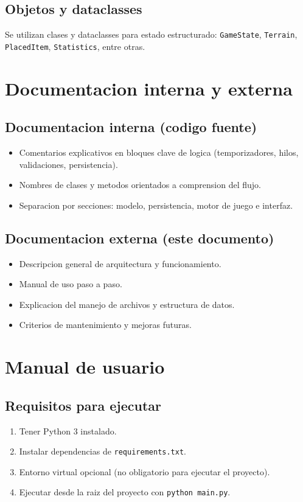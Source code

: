 \documentclass[12pt,a4paper]{article}
\begin{document}
\subsection{Objetos y dataclasses}
Se utilizan clases y dataclasses para estado estructurado: \texttt{GameState}, \texttt{Terrain}, \texttt{PlacedItem}, \texttt{Statistics}, entre otras.

\section{Documentacion interna y externa}
\subsection{Documentacion interna (codigo fuente)}
\begin{itemize}
    \item Comentarios explicativos en bloques clave de logica (temporizadores, hilos, validaciones, persistencia).
    \item Nombres de clases y metodos orientados a comprension del flujo.
    \item Separacion por secciones: modelo, persistencia, motor de juego e interfaz.
\end{itemize}

\subsection{Documentacion externa (este documento)}
\begin{itemize}
    \item Descripcion general de arquitectura y funcionamiento.
    \item Manual de uso paso a paso.
    \item Explicacion del manejo de archivos y estructura de datos.
    \item Criterios de mantenimiento y mejoras futuras.
\end{itemize}

\section{Manual de usuario}
\subsection{Requisitos para ejecutar}
\begin{enumerate}
    \item Tener Python 3 instalado.
    \item Instalar dependencias de \texttt{requirements.txt}.
    \item Entorno virtual opcional (no obligatorio para ejecutar el proyecto).
    \item Ejecutar desde la raiz del proyecto con \texttt{python main.py}.
\end{enumerate}
\end{document}
